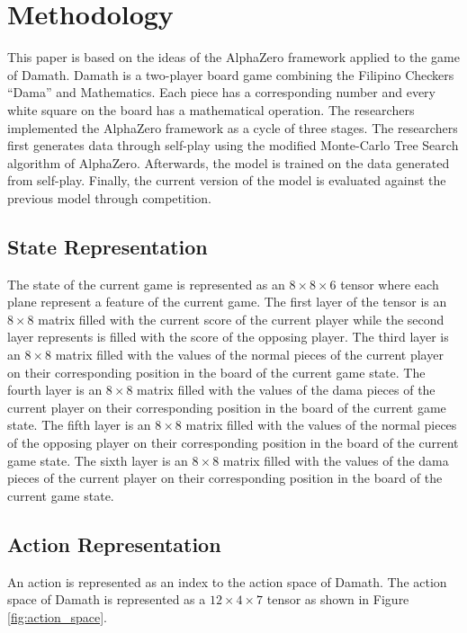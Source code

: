 \chapter{Methodology}

This paper is based on the ideas of the AlphaZero framework applied to the game of Damath. Damath is a two-player board game combining the Filipino Checkers ``Dama'' and Mathematics. Each piece has a corresponding number and every  white square on the board has a mathematical operation. The researchers implemented the AlphaZero framework as a cycle of three stages. The researchers first generates data through self-play using the modified Monte-Carlo Tree Search algorithm of AlphaZero. Afterwards, the model is trained on the data generated from self-play. Finally, the current version of the model is evaluated against the previous model through competition.

\section{State Representation}

The state of the current game is represented as an $8 \times 8 \times 6$ tensor where each plane represent a feature of the current game. The first layer of the tensor is an $8 \times 8$ matrix filled with the current score of the current player while the second layer represents is filled with the score of the opposing player. The third layer is an $8 \times 8$ matrix filled with the values of the normal pieces of the current player on their corresponding position in the board of the current game state. The fourth layer is an $8 \times 8$ matrix filled with the values of the dama pieces of the current player on their corresponding position in the board of the current game state. The fifth layer is an $8 \times 8$ matrix filled with the values of the normal pieces of the opposing player on their corresponding position in the board of the current game state. The sixth layer is an $8 \times 8$ matrix filled with the values of the dama pieces of the current player on their corresponding position in the board of the current game state.

\section{Action Representation}

An action is represented as an index to the action space of Damath. The action space of Damath is represented as a $12 \times 4 \times 7$ tensor as shown in Figure \ref{fig:action_space}.

